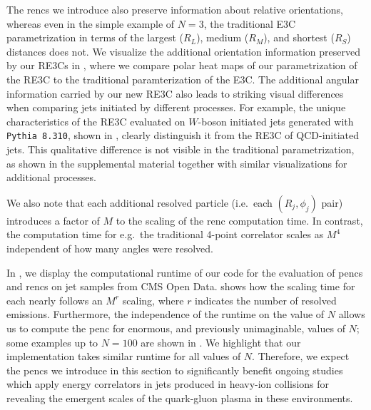 The \glspl{renc} we introduce also preserve information about relative orientations, whereas even in the simple example of $N=3$, the traditional E3C parametrization in terms of the largest ($R_L$), medium ($R_M$), and shortest ($R_S$) distances does not.
%
We visualize the additional orientation information preserved by our RE3Cs in , where we compare polar heat maps of our parametrization of the RE3C to the traditional paramterization of the E3C.
%
The additional angular information carried by our new RE3C also leads to striking visual differences when comparing jets initiated by different processes.
%
For example, the unique characteristics of the RE3C evaluated on $W$-boson initiated jets generated with \texttt{Pythia 8.310}, shown in , clearly distinguish it from the RE3C of QCD-initiated jets.
%
This qualitative difference is not visible in the traditional parametrization, as shown in the supplemental material together with similar visualizations for additional processes.


We also note that each additional resolved particle (i.e.\ each \((R_j, \phi_j)\) pair) introduces a factor of $M$ to the scaling of the \gls{renc} computation time.
%
In contrast, the computation time for e.g.~the traditional 4-point correlator scales as $M^4$ independent of how many angles were resolved.


In , we display the computational runtime of our code for the evaluation of \glspl{penc} and \glspl{renc} on jet samples from CMS Open Data.
%
 shows how the scaling time for each nearly follows an \(M^r\) scaling, where \(r\) indicates the number of resolved emissions.
%
Furthermore, the independence of the runtime on the value of \(N\) allows us to compute the \gls{penc} for enormous, and previously unimaginable, values of \(N\);
%
some examples up to \(N = 100\) are shown in .
%
We highlight that our implementation takes similar runtime for all values of $N$.
%
Therefore, we expect the \glspl{penc} we introduce in this section to significantly benefit ongoing studies which apply energy correlators in jets produced in heavy-ion collisions for revealing the emergent scales of the quark-gluon plasma in these environments.

